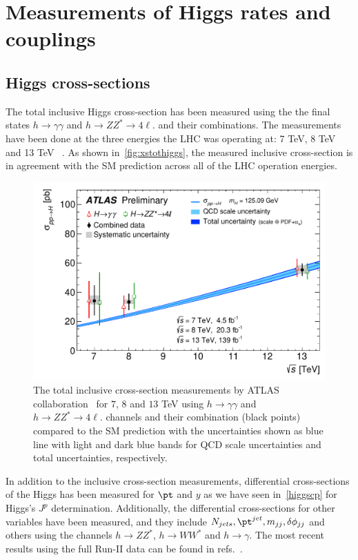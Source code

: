 \section{Measurements of Higgs rates and couplings \label{sec:Higgscoupl} }
\subsection{Higgs cross-sections}
\par The total inclusive Higgs cross-section has been measured using the the final states $ h \to \gamma \gamma$ and $ h\to Z Z^* \to 4 \ell$. and their combinations.  The measurements have been done at the three energies the LHC was operating at: 7 TeV, 8 TeV ~\cite{CMS:2015zpx} and 13 TeV~\cite{TheATLAScollaboration:2015uuh,CMS:2018gwt,CMS:2021ugl.ATLAS:2019mju} . As shown in~\autoref{fig:xstothiggs}, the measured inclusive cross-section is in agreement with the SM prediction across all of the LHC operation energies.
\begin{figure}[htb!]
	\begin{center}
		\includegraphics[height=0.35\textheight]{figures/Higgs_results/fig_01}
		\caption{The total inclusive cross-section measurements by ATLAS collaboration~\cite{ATLAS:2019mju} for $7$, $8$ and $13$ TeV using  $ h \to \gamma \gamma$ and $ h\to Z Z^* \to 4 \ell$. channels and their combination (black points) compared to the SM prediction with the  uncertainties shown as blue line with light and dark blue bands for QCD scale uncertainties and total uncertainties, respectively. }	
		\label{fig:xstothiggs}
	\end{center}
\end{figure}
\par In addition to the inclusive cross-section measurements,  differential cross-sections of the Higgs has been measured for $\pt$ and  $y$ as we have seen in~\autoref{higgscp} for Higgs's $J^p$ determination. Additionally,  the differential cross-sections for other variables have been measured, and they include $N_{jets}, \pt^{jet}, m_{jj},\delta \phi_{jj}$ and others using the channels $ h \to ZZ^*$, $h \to W W^*$ and $ h \to \gamma$. The most recent results using the full Run-II data can be found in refs.~\cite{CMS:2018gwt,ATLAS:2019jst,ATLAS:2019mju,CMS:2019chr}.  \\
